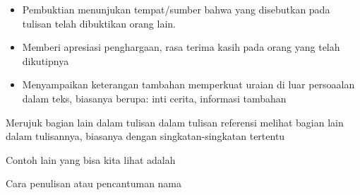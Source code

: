 \begin{itemize}
	\item Pembuktian menunjukan tempat/sumber bahwa yang disebutkan pada tulisan telah dibuktikan orang lain.\par

	\item Memberi apresiasi penghargaan, rasa terima kasih pada orang yang telah dikutipnya\par

	\item Menyampaikan keterangan tambahan memperkuat uraian di luar persoaalan dalam teks, biasanya berupa: inti cerita, informasi tambahan
\end{itemize}\par


\noindent Merujuk bagian lain dalam tulisan dalam tulisan referensi melihat bagian lain dalam tulisannya, biasanya dengan singkatan-singkatan tertentu\par


\noindent Contoh lain yang bisa kita lihat adalah\par


\noindent Cara penulisan atau pencantuman nama\par

